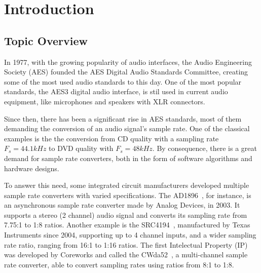 
\chapter{Introduction}
\label{chapter:introduction}

\section{Topic Overview}
\label{section:overview}

In 1977, with the growing popularity of audio interfaces, the Audio Engineering
Society (AES) founded the AES Digital Audio Standards Committee, creating some of
the most used audio standards to this day. One of the most popular standards, the
AES3 digital audio interface, is stil used in current audio equipment, like
microphones and speakers with XLR connectors.

Since then, there has been a significant rise in AES standards, most of them
demanding the conversion of an audio signal's sample rate. One of the classical
examples is the the conversion from CD quality with a sampling rate $F_s = 44.1 kHz$
to DVD quality with $F_s = 48 kHz$. By consequence, there is a great demand for
sample rate converters, both in the form of software algorithms and hardware
designs.

To answer this need, some integrated circuit manufacturers developed multiple
sample rate converters with varied specifications. The AD1896~\cite{ad1896}, for
instance, is an asynchronous sample rate converter made by Analog Devices, in
2003. It supports a stereo (2 channel) audio signal and converts its sampling
rate from 7.75:1 to 1:8 ratios. Another example is the SRC4194~\cite{src4194},
manufactured by Texas Instruments since 2004, supporting up to 4 channel inputs,
and a wider sampling rate ratio, ranging from 16:1 to 1:16 ratios. The first
Intelectual Property (IP) was developed by Coreworks and called the CWda52~\cite{cwda52},
a multi-channel sample rate converter, able to convert sampling
rates using ratios from 8:1 to 1:8.


